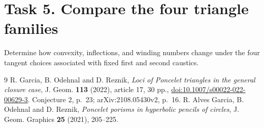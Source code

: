 \documentclass[11pt]{article}
\begin{document}
\section*{Task 5. Compare the four triangle families}
Determine how convexity, inflections, and winding numbers change
under the four tangent choices associated with fixed first and
second caustics.

\begin{thebibliography}{9}
R. Garcia, B. Odehnal and D. Reznik,
\emph{Loci of Poncelet triangles in the general closure case},
J. Geom. \textbf{113} (2022), article 17, 30 pp.,
\href{https://doi.org/10.1007/s00022-022-00629-3}{doi:10.1007/s00022-022-00629-3}.
Conjecture 2, p.~23; arXiv:2108.05430v2, p.~16.
R. Alves Garcia, B. Odehnal and D. Reznik,
\emph{Poncelet porisms in hyperbolic pencils of circles},
J. Geom. Graphics \textbf{25} (2021), 205--225.
\end{thebibliography}
\end{document}
